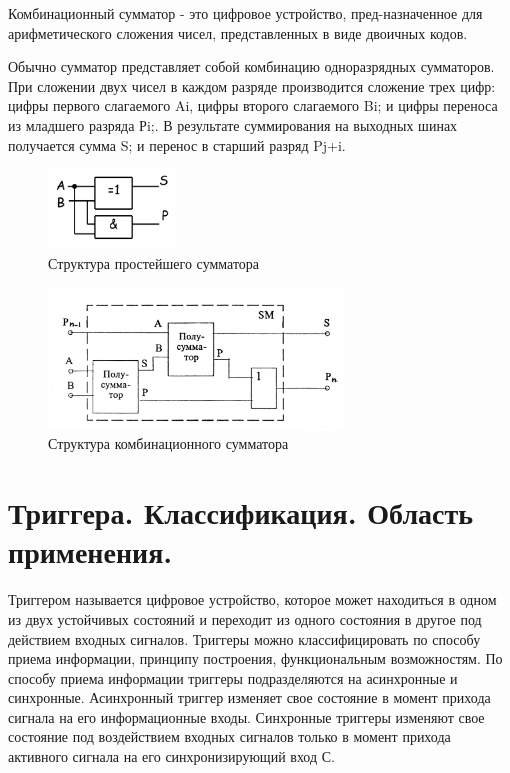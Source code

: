 \documentclass[unicode, 12pt, a4paper, oneside]{article}
\begin{document}
Комбинационный сумматор - это цифровое устройство, пред-назначенное для арифметического сложения чисел, представленных в виде двоичных кодов.

Обычно сумматор представляет собой комбинацию одноразрядных сумматоров. При сложении двух чисел в каждом разряде производится сложение трех цифр: цифры первого слагаемого Ai, цифры второго слагаемого Bi; и цифры переноса из младшего разряда Рi;. В результате суммирования на выходных шинах получается сумма S; и перенос в старший разряд Pj+i.

\begin{figure}[H]
\centering
\includegraphics[width=0.3\textwidth]{12_additor.jpg}
\caption{Структура простейшего сумматора}
\label{fig:12_additor}
\end{figure}

\begin{figure}[H]
\centering
\includegraphics[width=0.7\textwidth]{12_cs.jpg}
\caption{Структура комбинационного сумматора}
\label{fig:12_cs}
\end{figure}


\section{Триггера. Классификация. Область применения.}

Триггером называется цифровое устройство, которое может находиться в одном из двух устойчивых состояний и переходит из одного состояния в другое под действием входных сигналов. Триггеры можно классифицировать по способу приема информации, принципу построения, функциональным возможностям. По способу приема информации триггеры подразделяются на асинхронные и синхронные. Асинхронный триггер изменяет свое состояние в момент прихода сигнала на его информационные входы. Синхронные триггеры изменяют свое состояние под воздействием входных сигналов только в момент прихода активного сигнала на его синхронизирующий вход С.
\end{document}
